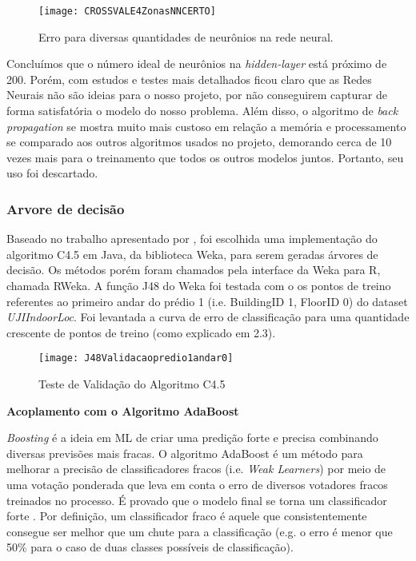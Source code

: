\begin{figure}[H]
	\centering
	\caption{Erro para diversas quantidades de neurônios na rede neural.}
  \texttt{[image: CROSSVALE4ZonasNNCERTO]}
\label{fig:crossNN}

\end{figure}




Concluímos que o número ideal de neurônios na  \textit{hidden-layer} está próximo de 200. Porém, com estudos e testes mais detalhados ficou claro que as Redes Neurais não são ideias para o nosso projeto, por não conseguirem capturar de forma satisfatória o modelo do nosso problema. Além disso, o algoritmo de \textit{back propagation} se mostra muito mais custoso em relação a memória e processamento se comparado aos outros algoritmos usados no projeto, demorando cerca de 10 vezes mais para o treinamento que todos os outros modelos juntos. Portanto, seu uso foi descartado.

\subsubsection{Arvore de decisão}


Baseado no trabalho apresentado por \cite{comparative}, foi escolhida uma implementação do algoritmo C4.5 \cite{quinlan} em Java, da biblioteca Weka, para serem geradas árvores de decisão. Os métodos porém foram chamados pela interface da Weka para R, chamada RWeka.
A função J48 do Weka foi testada com o os pontos de treino referentes ao primeiro andar do prédio 1 (i.e. BuildingID 1, FloorID 0)  do dataset \textit{UJIIndoorLoc}. Foi levantada a curva de erro de classificação para uma quantidade crescente de pontos de treino (como explicado em 2.3).


\begin{figure}[H]
\centering
\caption{Teste de Validação do Algoritmo C4.5}
 \texttt{[image: J48Validacaopredio1andar0]}
\label{fig:validationC4.5}
\end{figure}
\setcounter{secnumdepth}{4}

\textbf{Acoplamento com o Algoritmo AdaBoost}\\
\par \textit{Boosting} é a ideia em ML de criar uma predição forte e precisa combinando diversas previsões mais fracas. O algoritmo AdaBoost \cite{adaboost} é um método para melhorar a precisão de classificadores fracos (i.e. \textit{Weak Learners}) por meio de uma votação ponderada que leva em conta o erro de diversos votadores fracos treinados no processo. É provado que o modelo final se torna um classificador forte \cite{explainingadaboost}. Por definição, um classificador fraco é aquele que consistentemente consegue ser melhor que um chute para a classificação (e.g. o erro é menor que 50\% para o caso de duas classes possíveis de classificação).


